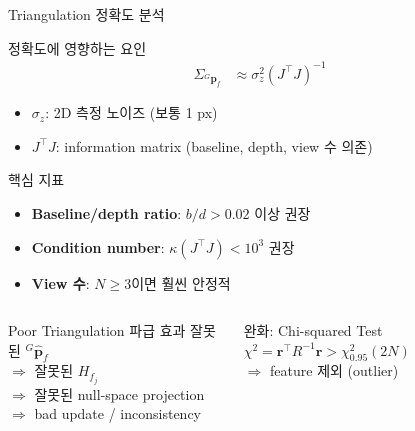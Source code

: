\begin{frame}[shrink=10]{Triangulation 정확도 분석}
  \begin{block}{정확도에 영향하는 요인}
    \begin{align*}
      \Sigma_{{}^G\bm{p}_f} &\approx \sigma_z^2 \left(J^\top J\right)^{-1}
    \end{align*}
    \begin{itemize}
      \item $\sigma_z$: 2D 측정 노이즈 (보통 1 px)
      \item $J^\top J$: information matrix (baseline, depth, view 수 의존)
    \end{itemize}
  \end{block}
  \begin{block}{핵심 지표}
    \begin{itemize}
      \item \textbf{Baseline/depth ratio}: $b/d > 0.02$ 이상 권장
      \item \textbf{Condition number}: $\kappa(J^\top J) < 10^3$ 권장
      \item \textbf{View 수}: $N \geq 3$이면 훨씬 안정적
    \end{itemize}
  \end{block}
  \begin{columns}[T]
      \begin{alertblock}{Poor Triangulation 파급 효과}
        잘못된 ${}^G\hat{\bm{p}}_f$\\
        $\Rightarrow$ 잘못된 $H_{f_j}$\\
        $\Rightarrow$ 잘못된 null-space projection\\
        $\Rightarrow$ bad update / inconsistency
      \end{alertblock}
      \begin{exampleblock}{완화: Chi-squared Test}
        $\chi^2 = \bm{r}^\top R^{-1} \bm{r} > \chi^2_{0.95}(2N)$\\
        $\Rightarrow$ feature 제외 (outlier)
      \end{exampleblock}
  \end{columns}
\end{frame}


